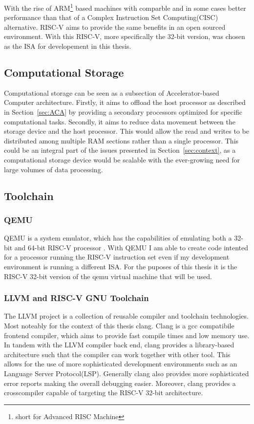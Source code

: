 With the rise of ARM\footnote{short for Advanced RISC Machine} based machines
with comparble and in some cases better performance than that of a Complex
Instruction Set Computing(CISC) alternative.\cite{Power_Struggle} RISC-V aims to
provide the same benefits in an open sourced environment. With this RISC-V, more
specifically the 32-bit version, was chosen as the ISA for developement in this
thesis.

\subsection{Computational Storage}
Computational storage can be seen as a subsection of Accelerator-based Computer
architecture. Firstly, it aims to offload the host processor as described in
Section~\ref{sec:ACA} by providing a secondary processors optimized for specific
computational tasks. Secondly, it aims to reduce data movement between the
storage device and the host processor. This would allow the read and writes to
be distributed among multiple RAM sections rather than a single processor. This
could be an integral part of the issues presented in Section~\ref{sec:context},
as a computational storage device would be scalable with the ever-growing need
for large volumes of data processing.


\subsection{Toolchain}
\subsubsection*{QEMU}
QEMU is a system emulator, which has the capabilities of emulating both a 32-bit
and 64-bit RISC-V processor \cite{QEMU}. With QEMU I am able to create code intented
for a processor running the RISC-V instruction set even if my development
environment is running a different ISA. For the puposes of this thesis it is the
RISC-V 32-bit version of the qemu virtual machine that will be used.

\subsubsection*{LLVM and RISC-V GNU Toolchain}
The LLVM project is a collection of reusable compiler and toolchain
technologies. Most noteably for the context of this thesis clang. Clang is a gcc
compatibile frontend compiler, which aims to provide fast compile times and low
memory use. In tandem with the LLVM compiler back end, clang provides a
library-based architecture such that the compiler can work together with other
tool. This allows for the use of more sophisticated development environments
such as an Language Server Protocol(LSP). Generally clang also provides more
sophisticated error reports making the overall debugging easier. Moreover, clang
provides a crosscompiler capable of targeting the RISC-V 32-bit architecture.

